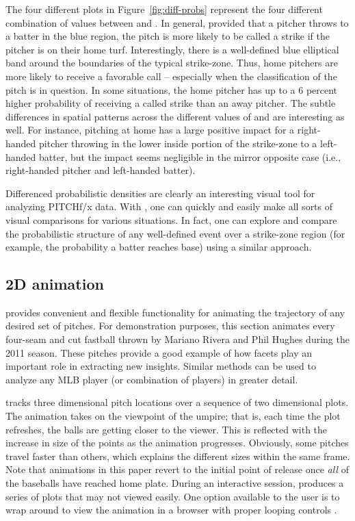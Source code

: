 \begin{article}
The four different plots in Figure~\ref{fig:diff-probs} represent
the four different combination of values between 
and . In general, provided that a pitcher throws to a
batter in the blue region, the pitch is more likely to be called a
strike if the pitcher is on their home turf. Interestingly, there
is a well-defined blue elliptical band around the boundaries of the
typical strike-zone. Thus, home pitchers are more likely to receive
a favorable call -- especially when the classification of the pitch
is in question. In some situations, the home pitcher has up to a 6
percent higher probability of receiving a called strike than an away
pitcher. The subtle differences in spatial patterns across the different
values of  and  are interesting as well.
For instance, pitching at home has a large positive impact for a right-handed
pitcher throwing in the lower inside portion of the strike-zone to
a left-handed batter, but the impact seems negligible in the mirror
opposite case (i.e., right-handed pitcher and left-handed batter).

Differenced probabilistic densities are clearly an interesting visual
tool for analyzing PITCHf/x data. With , one can quickly
and easily make all sorts of visual comparisons for various situations.
In fact, one can explore and compare the probabilistic structure of
any well-defined event over a strike-zone region (for example, the
probability a batter reaches base) using a similar approach. 

\subsection{2D animation}

 provides convenient and flexible functionality for
animating the trajectory of any desired set of pitches. For demonstration
purposes, this section animates every four-seam and cut fastball thrown
by Mariano Rivera and Phil Hughes during the 2011 season. These pitches
provide a good example of how facets play an important role in extracting
new insights. Similar methods can be used to analyze any MLB player
(or combination of players) in greater detail.

 tracks three dimensional pitch locations over a
sequence of two dimensional plots. The animation takes on the viewpoint
of the umpire; that is, each time the plot refreshes, the balls are
getting closer to the viewer. This is reflected with the increase
in size of the points as the animation progresses. Obviously, some
pitches travel faster than others, which explains the different sizes
within the same frame. Note that animations in this paper revert to
the initial point of release once \emph{all} of the baseballs have
reached home plate. During an interactive session, 
produces a series of plots that may not viewed easily. One option
available to the user is to wrap  around
 to view the animation in a browser with proper looping
controls \citep{animation}.


\end{article}
